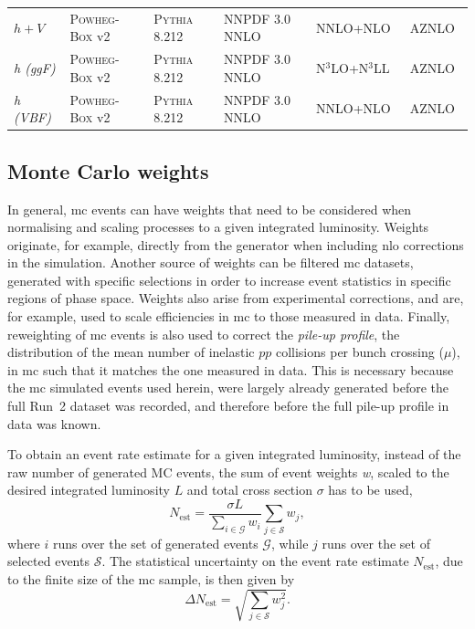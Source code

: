\begin{table}
{\begin{tabular} {llllll}
	$h+V$ & \textsc{Powheg-Box} v2 & \textsc{Pythia} 8.212 & NNPDF 3.0 NNLO & NNLO+NLO~\cite{deFlorian:2016spz} & AZNLO~\cite{ATL-PHYS-PUB-2013-017} \\
	\textit{h (ggF)} & \textsc{Powheg-Box} v2 & \textsc{Pythia} 8.212 & NNPDF 3.0 NNLO & N$^3$LO+N$^3$LL~\cite{deFlorian:2016spz} & AZNLO \\
	\textit{h (VBF)} & \textsc{Powheg-Box} v2 & \textsc{Pythia} 8.212 & NNPDF 3.0 NNLO & NNLO+NLO~\cite{deFlorian:2016spz} & AZNLO \\
	\bottomrule
	\end{tabular}}\vspace{3mm}
	\label{tab:mc_generators}   
\end{table}

\subsection{Monte Carlo weights}\label{sec:mc_weights}

In general, \gls{mc} events can have weights that need to be considered when normalising and scaling processes to a given integrated luminosity.
Weights originate, for example, directly from the generator when including \gls{nlo} corrections in the simulation.
Another source of weights can be filtered \gls{mc} datasets, generated with specific selections in order to increase event statistics in specific regions of phase space.
Weights also arise from experimental corrections, and are, for example, used to scale efficiencies in \gls{mc} to those measured in data. Finally, reweighting of \gls{mc} events is also used to correct the \textit{pile-up profile}, \ie the distribution of the mean number of inelastic $pp$ collisions per bunch crossing ($\mu$), in \gls{mc} such that it matches the one measured in data.
This is necessary because the \gls{mc} simulated events used herein, were largely already generated before the full Run~2 dataset was recorded, and therefore before the full pile-up profile in data was known.

To obtain an event rate estimate for a given integrated luminosity, instead of the raw number of generated MC events, the sum of event weights \textit{w}, scaled to the desired integrated luminosity $L$ and total cross section $\sigma$ has to be used,
\begin{equation}
	N_\mathrm{est} =\frac{\sigma L}{\sum_{i\in\mathcal{G}}w_i} \sum_{j\in\mathcal{S}}w_j,
\end{equation}
where $i$ runs over the set of generated events $\mathcal{G}$, while $j$ runs over the set of selected events $\mathcal{S}$. The statistical uncertainty on the event rate estimate $N_\mathrm{est}$, due to the finite size of the \gls{mc} sample, is then given by
 \begin{equation}
	\Delta N_\mathrm{est} = \sqrt{\sum_{j\in\mathcal{S}}w_j^2}.
\end{equation}

